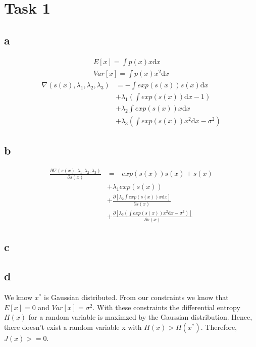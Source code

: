 \section*{Task 1}

\subsection*{a}
\begin{gather*}
E[x] = \int p(x) x \mathrm{d}x \\
Var[x] = \int p(x) x^2 \mathrm{d}x
\end{gather*}
\begin{equation}
\begin{split}
\nabla(s(x), \lambda_1, \lambda_2, \lambda_3) & = - \int exp(s(x))s(x) \mathrm{d}x \\
                                              &     + \lambda_1(\int exp(s(x)) \mathrm{d}x - 1) \\
                                              &     + \lambda_2 \int exp(s(x)) x \mathrm{d}x \\
                                              &     + \lambda_3 (\int exp(s(x))x^2 \mathrm{d}x - \sigma^2)
\end{split}
\end{equation}

\subsection*{b}

\begin{equation}
\begin{split}
    \frac{\partial \nabla(s(x), \lambda_1, \lambda_2, \lambda_3)}{\partial s(x)} & = - exp(s(x))s(x) + s(x) \\
                                                   & + \lambda_1 exp(s(x)) \\
                                                   & + \frac{\partial [\lambda_2 \int exp(s(x)) x \mathrm{d}x]}{\partial s(x)} \\
                                                   & + \frac{\partial [\lambda_3 (\int exp(s(x))x^2 \mathrm{d}x - \sigma^2)]}{\partial s(x)}
\end{split}
\end{equation}

\subsection*{c}

\subsection*{d}

We know $x^{*}$ is Gaussian distributed. From our constraints we know that $E[x]
= 0$ and $Var[x] = \sigma^{2}$. With these constraints the differential entropy
$H(x)$ for a random variable is maximzed by the Gaussian distribution. Hence,
there doesn't exist a random variable x with $H(x)>H(x^*)$. Therefore, $J(x) >=
0 $.